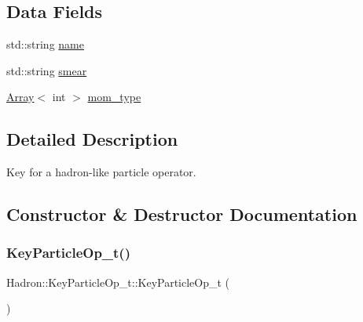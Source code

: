 \subsection*{Data Fields}
\begin{DoxyCompactItemize}
\item 
std\+::string \mbox{\hyperlink{structHadron_1_1KeyParticleOp__t_aa2f5e2300b1f43da6209d37aa8dba130}{name}}
\item 
std\+::string \mbox{\hyperlink{structHadron_1_1KeyParticleOp__t_a5bf85aa6188a5ea919dd6fc935ef0eb5}{smear}}
\item 
\mbox{\hyperlink{classXMLArray_1_1Array}{Array}}$<$ int $>$ \mbox{\hyperlink{structHadron_1_1KeyParticleOp__t_a845158fe34d7d51f821696f3be8837be}{mom\+\_\+type}}
\end{DoxyCompactItemize}


\subsection{Detailed Description}
Key for a hadron-\/like particle operator. 

\subsection{Constructor \& Destructor Documentation}
\mbox{\label{structHadron_1_1KeyParticleOp__t_aeb83d38886aa274e5e579d1828529809}} 
\subsubsection{\texorpdfstring{KeyParticleOp\_t()}{KeyParticleOp\_t()}\hspace{0.1cm}{\footnotesize\ttfamily [1/6]}}
{\footnotesize\ttfamily Hadron\+::\+Key\+Particle\+Op\+\_\+t\+::\+Key\+Particle\+Op\+\_\+t (\begin{DoxyParamCaption}{ }\end{DoxyParamCaption})\hspace{0.3cm}{\ttfamily [inline]}}

\mbox{\label{structHadron_1_1KeyParticleOp__t_af5270bac6d21394783c83e08224d71b6}} 
